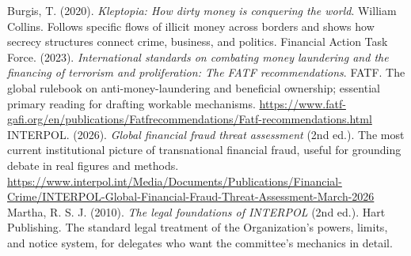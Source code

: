 
\begin{referencelist}
   Burgis, T. (2020). \emph{Kleptopia: How dirty money is conquering the world}. William Collins. Follows specific flows of illicit money across borders and shows how secrecy structures connect crime, business, and politics.
   Financial Action Task Force. (2023). \emph{International standards on combating money laundering and the financing of terrorism and proliferation: The FATF recommendations}. FATF. The global rulebook on anti-money-laundering and beneficial ownership; essential primary reading for drafting workable mechanisms. \url{https://www.fatf-gafi.org/en/publications/Fatfrecommendations/Fatf-recommendations.html}
   INTERPOL. (2026). \emph{Global financial fraud threat assessment} (2nd ed.). The most current institutional picture of transnational financial fraud, useful for grounding debate in real figures and methods. \url{https://www.interpol.int/Media/Documents/Publications/Financial-Crime/INTERPOL-Global-Financial-Fraud-Threat-Assessment-March-2026}
   Martha, R. S. J. (2010). \emph{The legal foundations of INTERPOL} (2nd ed.). Hart Publishing. The standard legal treatment of the Organization’s powers, limits, and notice system, for delegates who want the committee’s mechanics in detail.
\end{referencelist}
